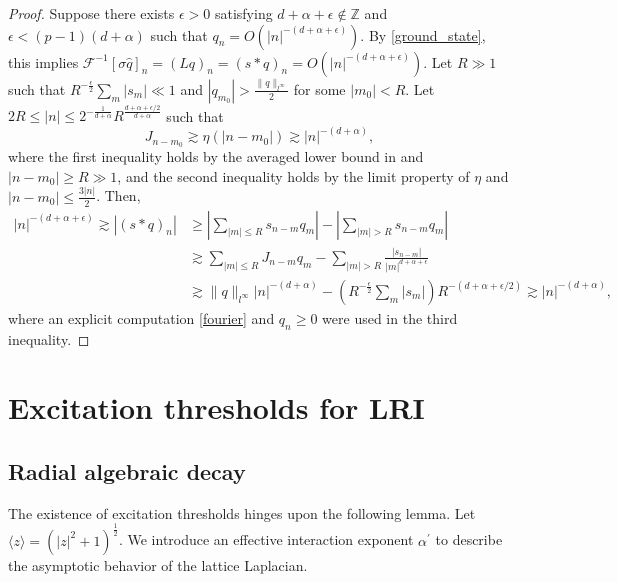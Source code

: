 \documentclass{article}
\numberwithin{equation}{section}
\begin{document}
\begin{proof}
Suppose there exists $\epsilon>0$ satisfying $d+\alpha + \epsilon \notin \mathbb{Z}$ and $\epsilon < (p-1)(d+\alpha)$ such that $q_n = O(|n|^{-(d+\alpha+\epsilon)})$. By \eqref{ground_state}, this implies $\mathcal{F}^{-1}[\sigma \widehat{q}]_{n} = (Lq)_{n} = (s \ast q)_{n} = O(|n|^{-(d+\alpha+\epsilon)})$. Let $R \gg 1$ such that $R^{-\frac{\epsilon}{2}}\sum\limits_{m} |s_m| \ll 1$ and $|q_{m_0}| > \frac{\| q \|_{l^\infty}}{2}$ for some $|m_0| < R$. Let $2R \leq |n| \leq 2^{-\frac{1}{d+\alpha}} R^{\frac{d+\alpha+\epsilon/2}{d+\alpha}}$ such that
\begin{equation*}
J_{n-m_0} \gtrsim \eta(|n-m_0|) \gtrsim |n|^{-(d+\alpha)},    
\end{equation*}
where the first inequality holds by the averaged lower bound in  and $|n-m_0| \geq R \gg 1$, and the second inequality holds by the limit property of $\eta$ and $|n-m_0| \leq \frac{3 |n|}{2}$. Then,
\begin{equation}
\begin{split}
    |n|^{-(d+\alpha+\epsilon)}\gtrsim|(s \ast q)_n| &\geq \left|\sum_{|m| \leq R} s_{n-m} q_m\right| - \left|\sum_{|m| > R} s_{n-m} q_m\right|\\
    &\gtrsim \sum_{|m| \leq R} J_{n-m} q_m - \sum_{|m| > R} \frac{|s_{n-m}|}{|m|^{d+\alpha+\epsilon}}\\
    &\gtrsim \| q \|_{l^\infty} |n|^{-(d+\alpha)} - (R^{-\frac{\epsilon}{2}} \sum_{m} |s_m|) R^{-(d+\alpha+\epsilon/2)} \gtrsim |n|^{-(d+\alpha)},
\end{split}
\end{equation}
where an explicit computation \eqref{fourier} and $q_n \geq 0$ were used in the third inequality.    
\end{proof}
\section{Excitation thresholds for LRI}\label{ET}
\subsection{Radial algebraic decay}\label{radial_algebraic}

The existence of excitation thresholds hinges upon the following lemma. Let $\langle z \rangle = (|z|^2 + 1)^{\frac{1}{2}}$. We introduce an effective interaction exponent $\alpha^\prime$ to describe the asymptotic behavior of the lattice Laplacian.
\end{document}
